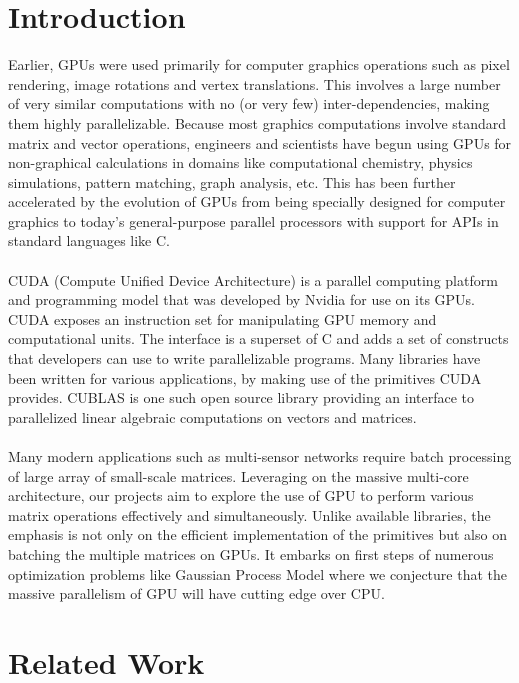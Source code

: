 \documentclass[11pt]{article}
\begin{document}
\maketitle
\tableofcontents

\newpage
\section{Introduction}
Earlier, GPUs were used primarily for computer graphics operations such as pixel rendering, image rotations and vertex translations. This involves a large number of very similar computations with no (or very few) inter-dependencies, making them highly parallelizable. Because most graphics computations involve standard matrix and vector operations, engineers and scientists have begun using GPUs for non-graphical calculations in domains like computational chemistry, physics simulations, pattern matching, graph analysis, etc. This has been further accelerated by the evolution of GPUs from being specially designed for computer graphics to today’s general-purpose parallel processors with support for APIs in standard languages like C. \\\\
CUDA (Compute Unified Device Architecture) is a parallel computing platform and programming model that was developed by Nvidia for use on its GPUs. CUDA exposes an instruction set for manipulating GPU memory and computational units. The interface is a superset of C and adds a set of constructs that developers can use to write parallelizable programs.  Many libraries have been written for various applications, by making use of the primitives CUDA provides. CUBLAS is one such open source library providing an interface to parallelized linear algebraic computations on vectors and matrices.\\\\
Many modern applications such as multi-sensor networks require batch processing of large array of small-scale matrices. Leveraging on the massive multi-core architecture, our projects aim to explore the use of GPU to perform various matrix operations effectively and simultaneously. Unlike available libraries, the emphasis is not only on the efficient implementation of the primitives but also on batching the multiple matrices on GPUs. It embarks on first steps of numerous optimization problems like Gaussian Process Model where we conjecture that the massive parallelism of GPU will have cutting edge over CPU.

\section{Related Work}
\end{document}
